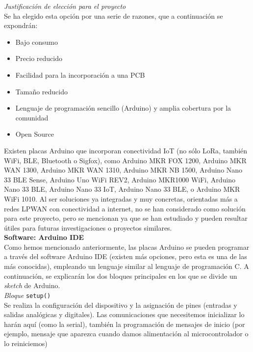 \documentclass[12pt]{article}
\begin{document}
	\noindent \textit{Justificación de elección para el proyecto} \\
	
	\noindent Se ha elegido esta opción por una serie de razones, que a continuación se expondrán: 
	
	\begin{itemize}
		\item Bajo consumo
		\item Precio reducido
		\item Facilidad para la incorporación a una PCB
		\item Tamaño reducido
		\item Lenguaje de programación sencillo (Arduino) y amplia cobertura por la comunidad
		\item Open Source
	\end{itemize}
	

	\noindent Existen placas Arduino que incorporan conectividad IoT (no sólo LoRa, también WiFi, BLE, Bluetooth o Sigfox), como Arduino MKR FOX 1200, Arduino MKR WAN 1300, Arduino MKR WAN 1310, Arduino MKR NB 1500, Arduino Nano 33 BLE Sense, Arduino Uno WiFi REV2, Arduino MKR1000 WiFi, Arduino Nano 33 BLE, Arduino Nano 33 IoT, Arduino Nano 33 BLE, o Arduino MKR WiFi 1010.  Al ser soluciones ya integradas y muy concretas, orientadas más a redes LPWAN con conectividad a internet, no se han considerado como solución para este proyecto, pero se mencionan ya que se han estudiado y pueden resultar útiles para futuras investigaciones o proyectos similares.\\
	
	
	\noindent \textbf{Software: Arduino IDE} \\
	
	
	\noindent Como hemos mencionado anteriormente, las placas Arduino se pueden programar a través del software Arduino IDE (existen más opciones, pero esta es una de las más conocidas), empleando un lenguaje similar al lenguaje de programación C. A continuación, se explicarán los dos bloques principales en los que se divide un \textit{sketch} de Arduino.\\
	
	\noindent \textit{Bloque} \texttt{setup()} \\
	
	\noindent Se realiza la configuración del dispositivo y la
	asignación de pines (entradas y salidas analógicas y digitales). Las comunicaciones que necesitemos inicializar lo harán aquí (como la serial), también la programación de mensajes de inicio (por ejemplo, mensaje que aparezca cuando damos alimentación al microcontrolador o lo reiniciemos)\\
	
\end{document}
